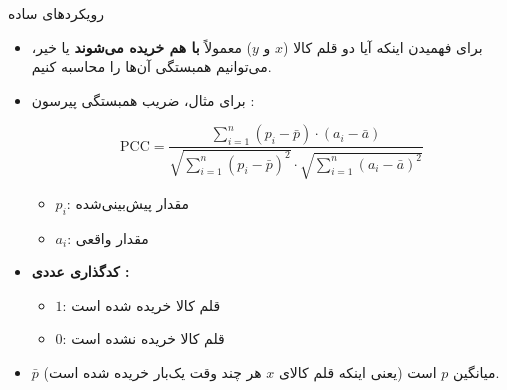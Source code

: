 \begin{frame}{رویکردهای ساده}{}
\begin{itemize}\setlength{\itemsep}{4pt}
    \item برای فهمیدن اینکه آیا دو قلم کالا ($x$ و $y$) معمولاً \textbf{با هم خریده می‌شوند} یا خیر، می‌توانیم همبستگی آن‌ها را محاسبه کنیم.
    \item برای مثال، ضریب همبستگی پیرسون :
    \begin{center}
    \begin{latin}
    \[
    \text{PCC} = \frac{\sum_{i=1}^n (p_i - \bar{p}) \cdot (a_i - \bar{a})}{\sqrt{\sum_{i=1}^n (p_i - \bar{p})^2} \cdot \sqrt{\sum_{i=1}^n (a_i - \bar{a})^2}}
    \]
    \end{latin}
    \end{center}
    \begin{itemize}\footnotesize\setlength{\itemsep}{1pt}
        \item $p_i$: مقدار پیش‌بینی‌شده 
        \item $a_i$: مقدار واقعی 
    \end{itemize}
    \item \textbf{کدگذاری عددی :}
    \begin{itemize}\footnotesize\setlength{\itemsep}{1pt}
        \item $1$: قلم کالا خریده شده است 
        \item $0$: قلم کالا خریده نشده است 
    \end{itemize}
    \item $\bar{p}$ میانگین $p$ است (یعنی اینکه قلم کالای $x$ هر چند وقت یک‌بار خریده شده است).
\end{itemize}
\end{frame}

